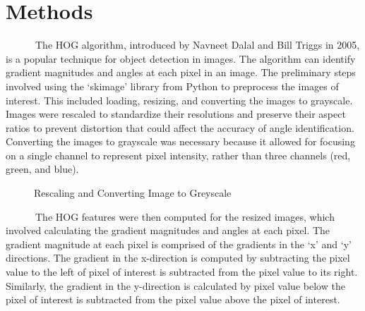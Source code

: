 \documentclass[
  letterpaper,
]{report}
\begin{document}

\hypertarget{methods}{%
\chapter{Methods}\label{methods}}

~~~~~~The HOG algorithm, introduced by Navneet Dalal and Bill Triggs in
2005, is a popular technique for object detection in images. The
algorithm can identify gradient magnitudes and angles at each pixel in
an image. The preliminary steps involved using the `skimage' library
from Python to preprocess the images of interest. This included loading,
resizing, and converting the images to grayscale. Images were rescaled
to standardize their resolutions and preserve their aspect ratios to
prevent distortion that could affect the accuracy of angle
identification. Converting the images to grayscale was necessary because
it allowed for focusing on a single channel to represent pixel
intensity, rather than three channels (red, green, and blue).

\begin{figure}

\begin{minipage}[t]{\linewidth}

{\centering 


}

\end{minipage}%

\caption{\label{fig-input_image}Rescaling and Converting Image to
Greyscale}

\end{figure}

~~~~~~The HOG features were then computed for the resized images, which
involved calculating the gradient magnitudes and angles at each pixel.
The gradient magnitude at each pixel is comprised of the gradients in
the `x' and `y' directions. The gradient in the x-direction is computed
by subtracting the pixel value to the left of pixel of interest is
subtracted from the pixel value to its right. Similarly, the gradient in
the y-direction is calculated by pixel value below the pixel of interest
is subtracted from the pixel value above the pixel of interest.
\end{document}
